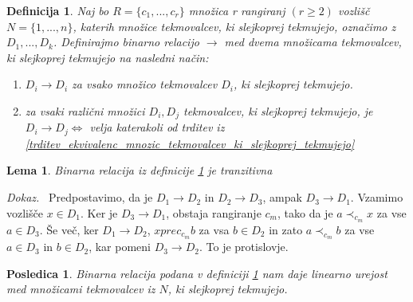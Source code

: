 \documentclass[a4paper, 12pt]{book}
\newtheorem{definicija}{Definicija}[chapter]
\newtheorem{lema}{Lema}[chapter]
\newtheorem{posledica}{Posledica}[chapter]
\newenvironment{dokaz}{\emph{Dokaz.}\ }{\hspace{\fill}{$\Box$}}
\begin{document}
\begin{definicija}
\label{definicija_relacije_mnozic_tekmovalcev_ki_slejoprej_tekmujejo}
    Naj bo $R = \{ c_1, ..., c_r \}$ množica r rangiranj $(r \geq 2)$ vozlišč $N = \{ 1, ..., n \}$, katerih množice tekmovalcev, ki slejkoprej tekmujejo, označimo z $D_1, ..., D_k$. Definirajmo binarno relacijo $\rightarrow$ med dvema množicama tekmovalcev, ki slejkoprej tekmujejo na nasledni način:
    \begin{enumerate}[label=(\roman*)]
        \item $D_i \rightarrow D_i$ za vsako množico tekmovalcev $D_i$, ki slejkoprej tekmujejo.
        \item za vsaki različni množici $D_i, D_j$ tekmovalcev, ki slejkoprej tekmujejo, je $D_i \rightarrow D_j \Leftrightarrow$ velja katerakoli od trditev iz \ref{trditev_ekvivalenc_mnozic_tekmovalcev_ki_slejkoprej_tekmujejo}
    \end{enumerate}
\end{definicija}

\begin{lema}
    Binarna relacija iz definicije \ref{definicija_relacije_mnozic_tekmovalcev_ki_slejoprej_tekmujejo} je tranzitivna
\end{lema}
\begin{dokaz}
    Predpostavimo, da je $D_1 \rightarrow D_2$ in $D_2 \rightarrow D_3$, ampak $D_3 \rightarrow D_1$. Vzamimo vozlišče $x \in D_1$. Ker je $D_3 \rightarrow D_1$, obstaja rangiranje $c_m$, tako da je $a \prec_{c_m} x$ za vse $a \in D_3$. Še več, ker $D_1 \rightarrow D_2$, $x prec_{c_m} b$ za vsa $b \in D_2$ in zato $a \prec_{c_m} b$ za vse $a \in D_3$ in $b \in D_2$, kar pomeni $D_3 \rightarrow D_2$. To je protislovje.
\end{dokaz}

\begin{posledica}
    Binarna relacija podana v definiciji \ref{definicija_relacije_mnozic_tekmovalcev_ki_slejoprej_tekmujejo} nam daje linearno urejost med množicami tekmovalcev iz $N$, ki slejkoprej tekmujejo.
\end{posledica}









\end{document}

